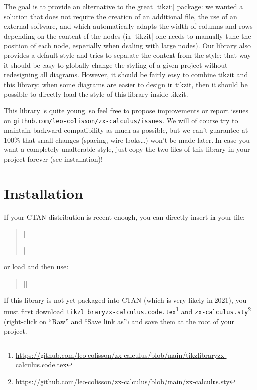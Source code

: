 \documentclass[a4paper,doc2]{ltxdoc} %
\newcommand{\mylink}[2]{\href{#1}{#2}\footnote{\url{#1}}}
\begin{document}
The goal is to provide an alternative to the great |tikzit| package: we wanted a solution that does not require the creation of an additional file, the use of an external software, and which automatically adapts the width of columns and rows depending on the content of the nodes (in |tikzit| one needs to manually tune the position of each node, especially when dealing with large nodes). Our library also provides a default style and tries to separate the content from the style: that way it should be easy to globally change the styling of a given project without redesigning all diagrams. However, it should be fairly easy to combine tikzit and this library: when some diagrams are easier to design in tikzit, then it should be possible to directly load the style of this library inside tikzit.

This library is quite young, so feel free to propose improvements or report issues on \href{https://github.com/leo-colisson/zx-calculus/issues}{\texttt{github.com/leo-colisson/zx-calculus/issues}}. We will of course try to maintain backward compatibility as much as possible, but we can't guarantee at 100\% that small changes (spacing, wire looks\dots{}) won't be made later. In case you want a completely unalterable style, just copy the two files of this library in your project forever (see installation)!

\section{Installation}

If your CTAN distribution is recent enough, you can directly insert in your file:
\begin{verse}
  |\usepackage{zx-calculus}|%
\end{verse}
or load \tikzname{} and then use:
\begin{verse}%
   |\usetikzlibrary{zx-calculus}|%
\end{verse}
If this library is not yet packaged into CTAN (which is very likely in 2021), you must first download \mylink{https://github.com/leo-colisson/zx-calculus/blob/main/tikzlibraryzx-calculus.code.tex}{\texttt{tikzlibraryzx-calculus.code.tex}} and \mylink{https://github.com/leo-colisson/zx-calculus/blob/main/zx-calculus.sty}{\texttt{zx-calculus.sty}} (right-click on ``Raw'' and ``Save link as'') and save them at the root of your project.
\end{document}
